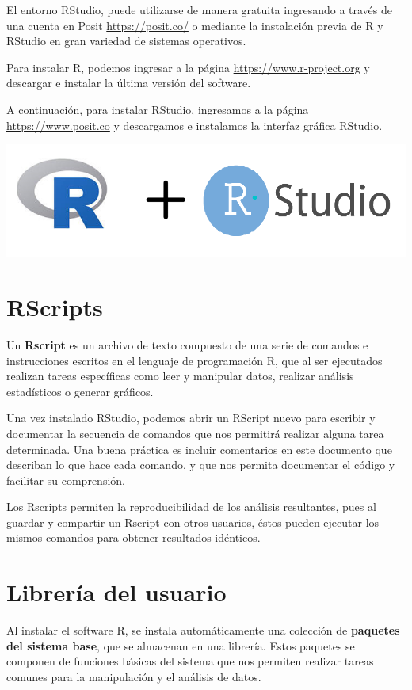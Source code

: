 \documentclass[
]{book}
\begin{document}
El entorno RStudio, puede utilizarse de manera gratuita ingresando a través de una cuenta en Posit \url{https://posit.co/} o mediante la instalación previa de R y RStudio en gran variedad de sistemas operativos.

Para instalar R, podemos ingresar a la página \url{https://www.r-project.org} y descargar e instalar la última versión del software.

A continuación, para instalar RStudio, ingresamos a la página \url{https://www.posit.co} y descargamos e instalamos la interfaz gráfica RStudio.

\includegraphics{RyRStudio.png}

\hypertarget{rscripts}{%
\section{RScripts}\label{rscripts}}

Un \textbf{Rscript} es un archivo de texto compuesto de una serie de comandos e instrucciones escritos en el lenguaje de programación R, que al ser ejecutados realizan tareas específicas como leer y manipular datos, realizar análisis estadísticos o generar gráficos.

Una vez instalado RStudio, podemos abrir un RScript nuevo para escribir y documentar la secuencia de comandos que nos permitirá realizar alguna tarea determinada. Una buena práctica es incluir comentarios en este documento que describan lo que hace cada comando, y que nos permita documentar el código y facilitar su comprensión.

Los Rscripts permiten la reproducibilidad de los análisis resultantes, pues al guardar y compartir un Rscript con otros usuarios, éstos pueden ejecutar los mismos comandos para obtener resultados idénticos.

\hypertarget{libreruxeda-del-usuario}{%
\section{Librería del usuario}\label{libreruxeda-del-usuario}}

Al instalar el software R, se instala automáticamente una colección de \textbf{paquetes del sistema base}, que se almacenan en una librería. Estos paquetes se componen de funciones básicas del sistema que nos permiten realizar tareas comunes para la manipulación y el análisis de datos.
\end{document}
